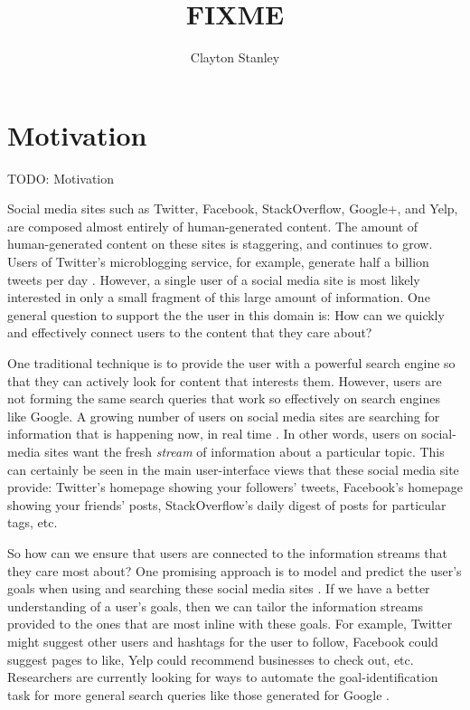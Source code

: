 \documentclass[man,floatsintext]{apa6}
\title{FIXME}
\author{Clayton Stanley}
\affiliation{Rice University}
\begin{document}
\maketitle

\tableofcontents
\newpage

\section{Motivation}

TODO: Motivation

Social media sites such as Twitter, Facebook, StackOverflow, Google+, and Yelp, are composed almost entirely of human-generated content.
The amount of human-generated content on these sites is staggering, and continues to grow.
Users of Twitter's microblogging service, for example, generate half a billion tweets per day \parencite{TwitterReport2012}.
However, a single user of a social media site is most likely interested in only a small fragment of this large amount of information.
One general question to support the the user in this domain is:
How can we quickly and effectively connect users to the content that they care about?

One traditional technique is to provide the user with a powerful search engine so that they can actively look for content that interests them.
However, users are not forming the same search queries that work so effectively on search engines like Google.
A growing number of users on social media sites are searching for information that is happening now, in real time \parencites{Bauer2012,Jansen2011}.
In other words, users on social-media sites want the fresh \emph{stream} of information about a particular topic.
This can certainly be seen in the main user-interface views that these social media site provide:
Twitter's homepage showing your followers' tweets, Facebook's homepage showing your friends' posts, StackOverflow's daily digest of posts for particular tags, etc.

So how can we ensure that users are connected to the information streams that they care most about?
One promising approach is to model and predict the user's goals when using and searching these social media sites \parencite{Rose2004}.
If we have a better understanding of a user's goals, then we can tailor the information streams provided to the ones that are most inline with these goals.
For example, Twitter might suggest other users and hashtags for the user to follow, Facebook could suggest pages to like, Yelp could recommend businesses to check out, etc.
Researchers are currently looking for ways to automate the goal-identification task for more general search queries like those generated for Google \parencites{Jansen2008}{Lee2005}.
\end{document}
